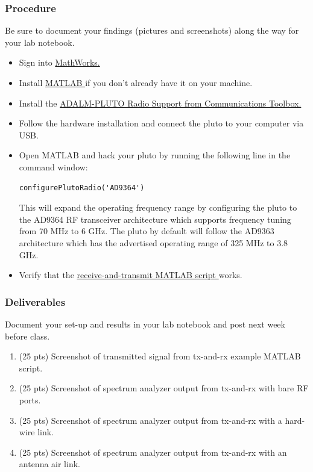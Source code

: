 \subsubsection{Procedure}
Be sure to document your findings (pictures and screenshots) along the way for your lab notebook. 
\begin{itemize}
    \item Sign into \href{https://www.mathworks.com/}{MathWorks. }
    \item Install \href{https://www.mathworks.com/products/get-matlab.html?s_tid=gn_getml}{MATLAB } if you don't already have it on your machine.
    \item Install the \href{https://www.mathworks.com/hardware-support/adalm-pluto-radio.html}{ADALM-PLUTO Radio Support from Communications Toolbox. }
    \item Follow the hardware installation and connect the pluto to your computer via USB.
    \item Open MATLAB and hack your pluto by running the following line in the command window:
    \begin{lstlisting}[style=Matlab-editor, numbers=none]
    configurePlutoRadio('AD9364')
    \end{lstlisting}
  This will expand the operating frequency range by configuring the pluto to the AD9364 RF transceiver architecture which supports frequency tuning from 70 MHz to 6 GHz. The pluto by default will follow the AD9363 architecture which has the advertised operating range of 325 MHz to 3.8 GHz. 
    \item Verify that the \href{https://github.com/rjmacaranas/ee-504/blob/main/lab1/pluto_tx_and_rx.m}{receive-and-transmit MATLAB script } works. 
\end{itemize}

\subsubsection{Deliverables}
Document your set-up and results in your lab notebook and post next week before class.
\begin{enumerate}
    \item (25 pts) Screenshot of transmitted signal from tx-and-rx example MATLAB script.
    \item (25 pts) Screenshot of spectrum analyzer output from tx-and-rx with bare RF ports.
    \item (25 pts) Screenshot of spectrum analyzer output from tx-and-rx with a hard-wire link.
    \item (25 pts) Screenshot of spectrum analyzer output from tx-and-rx with an antenna air link.
\end{enumerate} 




